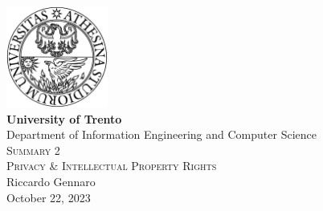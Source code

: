 \pagestyle{plain}

\thispagestyle{empty}

\begin{center}

  \includegraphics[width=0.25\textwidth]{I-initFolder/images/TrentoLOGO_2.png}\\[0.5cm]

  \textbf{\Large\textbf{University of Trento}}\\[0.5cm]

  Department of Information Engineering and Computer Science\\[4cm]

  \textsc{\huge Summary 2}\\[0.5cm]

  \textsc{Privacy \& Intellectual Property Rights}\\[1.5cm]

  Riccardo Gennaro\\[0.5cm]

  {October 22, 2023}

\end{center}%

